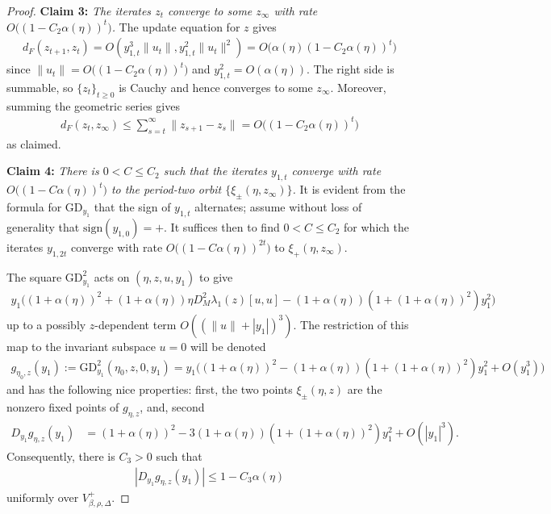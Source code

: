 \documentclass{article}
\newcommand{\GD}{\mathrm{GD}}
\theoremstyle{plain}
\theoremstyle{definition}
\theoremstyle{remark}
\begin{document}
\begin{proof}
    \noindent\textbf{Claim 3: }\emph{The iterates $z_t$ converge to some $z_{\infty}$ with rate $O\big((1-C_2\alpha(\eta))^t\big)$.} The update equation for $z$ gives
    \begin{align}
        d_F(z_{t+1},z_{t})
        = O(y_{1,t}^3\|u_{t}\|,y_{1,t}^2\|u_{t}\|^2)= O\big(\alpha(\eta)(1-C_2\alpha(\eta))^t\big)
    \end{align}
    since $\|u_t\| = O\big((1-C_2\alpha(\eta))^t\big)$ and $y_{1,t}^2 = O(\alpha(\eta))$. The right side is summable, so $\{z_{t}\}_{t\geq0}$ is Cauchy and hence converges to some $z_\infty$. Moreover, summing the geometric series gives
    \begin{align}
        d_F(z_{t},z_\infty) \leq\sum_{s=t}^{\infty}\|z_{s+1}-z_s\| =  O\big((1-C_2\alpha(\eta))^t\big)
    \end{align}
    as claimed.

    \noindent\textbf{Claim 4: }\emph{There is $0<C\leq C_2$ such that the iterates $y_{1,t}$ converge with rate $O\big((1-C\alpha(\eta))^t\big)$ to the period-two orbit $\{\xi_{\pm}(\eta,z_{\infty})\}$.} It is evident from the formula for $\GD_{y_1}$ that the sign of $y_{1,t}$ alternates; assume without loss of generality that $\mathrm{sign}(y_{1,0}) = +$. It suffices then to find $0<C\leq C_2$ for which the iterates $y_{1,2t}$ converge with rate $O\big((1-C\alpha(\eta))^{2t}\big)$ to $\xi_+(\eta,z_{\infty})$.
    
    The square $\GD^2_{y_1}$ acts on $(\eta,z,u,y_1)$ to give
    \begin{align}\label{eq:GD2}
    y_1\big((1+\alpha(\eta))^2 + (1+\alpha(\eta))\eta D^2_M\lambda_1(z)[u,u] -(1+\alpha(\eta))(1+(1+\alpha(\eta))^2)y_1^2\big)
    \end{align}
    up to a possibly $z$-dependent term $O((\|u\|+|y_1|)^3)$. The restriction of this map to the invariant subspace $u=0$ will be denoted
    \begin{align}\label{eq:gd2}
        g_{\eta_0,z}(y_1):=\GD_{y_1}^2(\eta_0,z,0,y_1) = y_1\big((1+\alpha(\eta))^2 -(1+\alpha(\eta))(1+(1+\alpha(\eta))^2)y_1^2+ O(y_1^3)\big)
    \end{align}
    and has the following nice properties: first, the two points $\xi_\pm(\eta,z)$ are the nonzero fixed points of $g_{\eta,z}$, and, second
    \begin{align}
        D_{y_1}g_{\eta,z}(y_1)
        &=(1+\alpha(\eta))^2
        -3(1+\alpha(\eta))(1+(1+\alpha(\eta))^2)y_1^2
        +O(|y_1|^3).
    \end{align}
    Consequently, there is $C_3>0$ such that
    \begin{align}\label{eq:scalarcontractionsupercritical}
        |D_{y_1}g_{\eta,z}(y_1)|\leq1-C_3\alpha(\eta)
    \end{align}
    uniformly over $V^+_{\beta,\rho,\Delta}$.


\end{proof}
\end{document}
